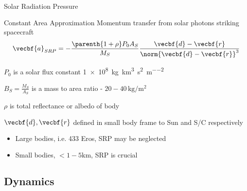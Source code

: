 \begin{frame}[noframenumbering,label=srp]{Solar Radiation Pressure} %

\begin{block}{Constant Area Approximation}
Momentum transfer from solar photons striking spacecraft
\begin{align*}
    \vecbf{a}_{SRP} = - \frac{\parenth{1 + \rho} P_0 A_{S}}{M_S} \frac{\vecbf{d} - \vecbf{r}}{\norm{\vecbf{d}-\vecbf{r}}^3}
\end{align*}

\( P_0\) is a solar flux constant \SI{1e8}{\kilogram\kilo\meter\cubed\per\second\squared\per\meter\squared}

\( B_S = \frac{M_S}{A_S} \) is a mass to area ratio - \( 20 - 40 \, \si{\kilogram\per\meter\squared} \)

\( \rho \) is total reflectance or albedo of body

\( \vecbf{d}, \vecbf{r} \) defined in small body frame to Sun and S/C respectively
\end{block}
\begin{itemize}
    \item Large bodies, i.e. 433 Eros, SRP may be neglected
    \item Small bodies, \( < 1-5 \si{\kilo\meter} \), SRP is crucial
\end{itemize}
\end{frame} %

\subsection{Dynamics}


